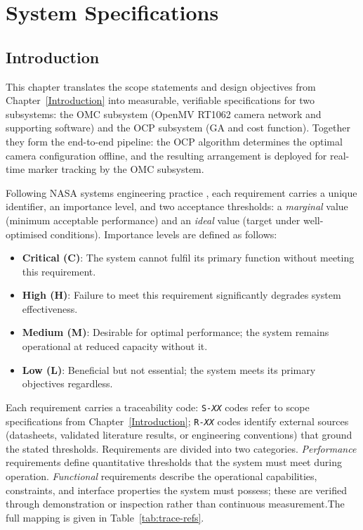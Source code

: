 \chapter{System Specifications}
\label{Systems_Specifications}

\section{Introduction}

This chapter translates the scope statements and design objectives from Chapter~\ref{Introduction} into measurable, verifiable specifications for two subsystems: the \gls{OMC} subsystem (OpenMV RT1062 camera network and supporting software) and the \gls{OCP} subsystem (\gls{GA} and cost function). Together they form the end-to-end pipeline: the \gls{OCP} algorithm determines the optimal camera configuration offline, and the resulting arrangement is deployed for real-time marker tracking by the \gls{OMC} subsystem.

Following NASA systems engineering practice \parencite{nasaSE2017}, each requirement carries a unique identifier, an importance level, and two acceptance thresholds: a \textit{marginal} value (minimum acceptable performance) and an \textit{ideal} value (target under well-optimised conditions). Importance levels are defined as follows:

\begin{itemize}
    \item \textbf{Critical (C)}: The system cannot fulfil its primary function without meeting this requirement.
    \item \textbf{High (H)}: Failure to meet this requirement significantly degrades system effectiveness.
    \item \textbf{Medium (M)}: Desirable for optimal performance; the system remains operational at reduced capacity without it.
    \item \textbf{Low (L)}: Beneficial but not essential; the system meets its primary objectives regardless.
\end{itemize}

Each requirement carries a traceability code: \texttt{S-\textit{XX}} codes refer to scope specifications from Chapter~\ref{Introduction}; \texttt{R-\textit{XX}} codes identify external sources (datasheets, validated literature results, or engineering conventions) that ground the stated thresholds. Requirements are divided into two categories. \textit{Performance} requirements define quantitative thresholds that the system must meet during operation. \textit{Functional} requirements describe the operational capabilities, constraints, and interface properties the system must possess; these are verified through demonstration or inspection rather than continuous measurement.The full mapping is given in Table~\ref{tab:trace-refs}.

